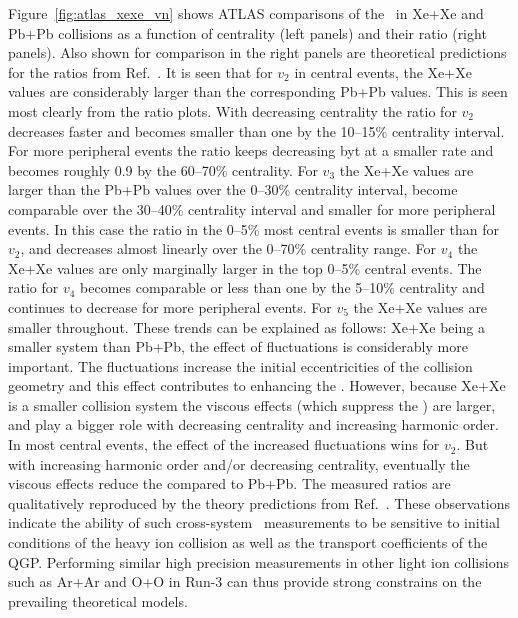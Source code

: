 Figure~\ref{fig:atlas_xexe_vn} shows ATLAS comparisons of the \vn\
  in Xe+Xe and Pb+Pb collisions as a function of centrality (left panels)
  and their ratio (right panels).
Also shown for comparison in the right panels are theoretical predictions
  for the ratios from Ref.~\cite{Giacalone:2017dud}.
It is seen that for $v_2$ in central events, the Xe+Xe values are
  considerably larger than the corresponding Pb+Pb values.
This is seen most clearly from the ratio plots.
With decreasing centrality the ratio for $v_2$ decreases faster and
  becomes smaller than one by the 10--15\% centrality interval.
For more peripheral events the ratio keeps decreasing byt at a
  smaller rate and becomes roughly 0.9 by the 60--70\% centrality.
For $v_3$ the Xe+Xe values are larger than the Pb+Pb values
  over the 0--30\% centrality interval,  become comparable over the
  30--40\% centrality interval and smaller for more peripheral events.
In this case the ratio in the 0--5\% most central events is smaller
  than for $v_2$, and decreases almost linearly over the 0--70\%
  centrality range.
For $v_4$ the Xe+Xe values are only marginally larger in the top
  0--5\% central events.
The ratio for $v_4$ becomes comparable or less than one by the
  5--10\% centrality and continues to decrease for
  more peripheral events.
For $v_5$ the Xe+Xe values are smaller throughout.
These trends can be explained as follows:
  Xe+Xe being a smaller system than Pb+Pb, the effect of fluctuations
  is considerably more important.
The fluctuations increase the initial eccentricities of the collision
  geometry and this effect contributes to enhancing the \vn.
However, because Xe+Xe is a smaller collision system the viscous
  effects (which suppress the \vn) are larger, and play a bigger role
  with decreasing centrality and increasing harmonic order.
In most central events, the effect of the increased fluctuations wins
  for $v_2$.
But with increasing harmonic order and/or decreasing centrality, 
  eventually the viscous effects reduce the \vn compared to Pb+Pb.
The measured ratios are qualitatively reproduced by the theory 
  predictions from Ref.~\cite{Giacalone:2017dud}.
These observations indicate the ability of such cross-system 
  \vn\ measurements to be sensitive to initial conditions of 
  the heavy ion collision as well as the transport coefficients
  of the QGP. 
Performing similar high precision measurements in other light ion 
  collisions such as Ar+Ar and O+O in Run-3 can thus provide strong 
  constrains on the prevailing theoretical models.

